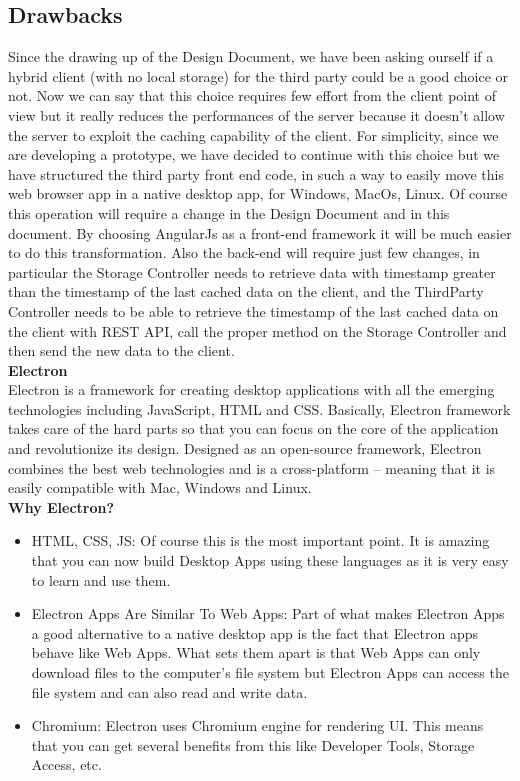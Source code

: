 \subsection{Drawbacks}
Since the drawing up of the Design Document, we have been asking ourself if a hybrid client (with no local storage) for the third party could be a good choice or not. Now we can say that this choice requires few effort from the client point of view but it really reduces the performances of the server because it doesn't allow the server to exploit the caching capability of the client.
For simplicity, since we are developing a prototype, we have decided to continue with this choice but we have structured the third party front end code, in such a way to easily move this web browser app in a native desktop app, for Windows, MacOs, Linux. Of course this operation will require a change in the Design Document and in this document.
By choosing AngularJs as a front-end framework it will be much easier to do this transformation. Also the back-end will require just few changes, in particular the Storage Controller needs to retrieve data with timestamp greater than the timestamp of the last cached data on the client, and the ThirdParty Controller needs to be able to retrieve the timestamp of the last cached data on the client with REST API, call the proper method on the Storage Controller and then send the new data to the client.\\

\textbf{Electron}\\

Electron is a framework for creating desktop applications with all the emerging technologies including JavaScript, HTML and CSS. Basically, Electron framework takes care of the hard parts so that you can focus on the core of the application and revolutionize its design.
Designed as an open-source framework, Electron combines the best web technologies and is a cross-platform – meaning that it is easily compatible with Mac, Windows and Linux.\\

\textbf{Why Electron?}
\begin{itemize}
\item HTML, CSS, JS: Of course this is the most important point. It is amazing that you can now build Desktop Apps using these languages as it is very easy to learn and use them.
\item Electron Apps Are Similar To Web Apps: Part of what makes Electron Apps a good alternative to a native desktop app is the fact that Electron apps behave like Web Apps. What sets them apart is that Web Apps can only download files to the computer’s file system but Electron Apps can access the file system and can also read and write data.
\item Chromium: Electron uses Chromium engine for rendering UI. This means that you can get several benefits from this like Developer Tools, Storage Access, etc.
\end{itemize}

